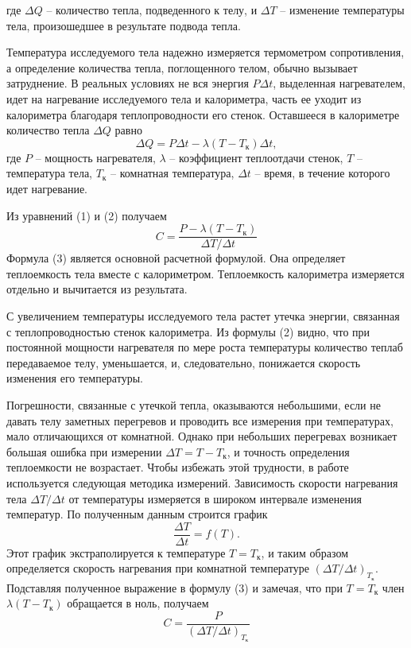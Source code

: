 \documentclass[12pt,a4paper]{article}
\begin{document}
где $\Delta Q$ -- количество тепла, подведенного к телу, и $\Delta T$ -- изменение температуры тела, произошедшее в результате подвода тепла.

Температура исследуемого тела надежно измеряется термометром сопротивления, а определение количества тепла, поглощенного телом, обычно вызывает затруднение. В реальных условиях не вся энергия $P \Delta t$, выделенная нагревателем, идет на нагревание исследуемого тела и калориметра, часть ее уходит из калориметра благодаря теплопроводности его стенок. Оставшееся в калориметре количество тепла $\Delta Q$ равно 
\begin{equation}
	\Delta Q = P\Delta t - \lambda(T - T_{\text{к}}) \Delta t,
	\label{eq:dQ}
\end{equation}
где $P$ -- мощность нагревателя, $\lambda$ -- коэффициент теплоотдачи стенок, $T$ -- температура тела, $T_{\text{к}}$ -- комнатная температура, $ \Delta t$ -- время, в течение которого идет нагревание.

Из уравнений (1) и (2) получаем
\begin{equation}
    C = \frac{P - \lambda(T - T_{\text{к}})}{\Delta T / \Delta t}
    \label{osnovnaya}
\end{equation}
Формула (3) является основной расчетной формулой. Она определяет теплоемкость тела вместе с калориметром. Теплоемкость калориметра измеряется отдельно и вычитается из результата.

С увеличением температуры исследуемого тела растет утечка энергии, связанная с теплопроводностью стенок калориметра. Из формулы (2) видно, что при постоянной мощности нагревателя по мере роста температуры количество теплаб передаваемое телу, уменьшается, и, следовательно, понижается скорость изменения его температуры.

Погрешности, связанные с утечкой тепла, оказываются небольшими, если не давать телу заметных перегревов и проводить все измерения при температурах, мало отличающихся от комнатной. Однако при небольших перегревах возникает большая ошибка при измерении $\Delta T = T - T_\text{к}$, и точность определения теплоемкости не возрастает. Чтобы избежать этой трудности, в работе используется следующая методика измерений. Зависимость скорости нагревания тела $\Delta T / \Delta t$ от температуры измеряется в широком интервале изменения температур. По полученным данным строится график
\begin{equation*}
    \frac{\Delta T}{\Delta t} = f(T).
\end{equation*}
Этот график экстраполируется к температуре $T = T_{\text{к}}$, и таким образом определяется скорость нагревания при комнатной температуре $(\Delta T / \Delta t)_{T_{\text{к}}}$. Подставляя полученное выражение в формулу (3) и замечая, что при $T = T_{\text{к}}$ член $\lambda(T - T_{\text{к}})$ обращается в ноль, получаем
\begin{equation}
    C = \frac{P}{(\Delta T / \Delta t)_{T_{\text{к}}}}
    \label{4}
\end{equation}
\end{document}
